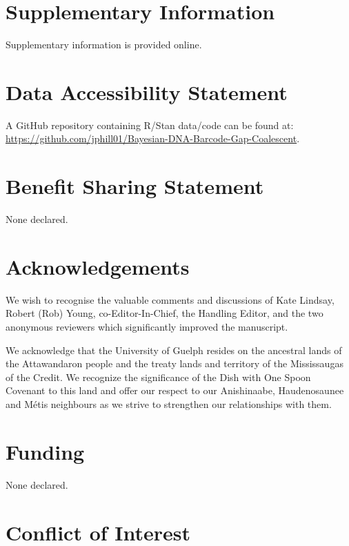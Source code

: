 \documentclass[12pt]{article}
\begin{document}
\newpage

\section*{Supplementary Information}

Supplementary information is provided online.

\section*{Data Accessibility Statement}

A GitHub repository containing R/Stan data/code can be found at: \\ \href{https://github.com/jphill01/Bayesian-DNA-Barcode-Gap-Coalescent}{https://github.com/jphill01/Bayesian-DNA-Barcode-Gap-Coalescent}.

\section*{Benefit Sharing Statement}

None declared.

\section*{Acknowledgements}

We wish to recognise the valuable comments and discussions of Kate Lindsay, Robert (Rob) Young, co-Editor-In-Chief, the Handling Editor, and the two anonymous reviewers which significantly improved the manuscript.

We acknowledge that the University of Guelph resides on the ancestral lands of the Attawandaron people and the treaty lands and territory of the Mississaugas of the Credit. We recognize the significance of the Dish with One Spoon Covenant to this land and offer our respect to our Anishinaabe, Haudenosaunee and M{\'e}tis neighbours as we strive to strengthen our relationships with them.

\section*{Funding}

None declared.

\section*{Conflict of Interest}
\end{document}
